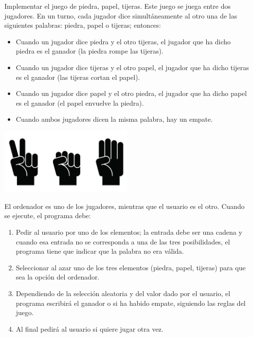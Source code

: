 \begin{ejercicio}
    Implementar el juego de piedra, papel, tijeras. Este juego se juega entre dos jugadores. En un turno, cada
jugador dice simultáneamente al otro una de las siguientes palabras: piedra, papel o tijeras; entonces:

\begin{itemize}
\item Cuando un jugador dice piedra y el otro tijeras, el jugador que ha dicho piedra es el ganador (la piedra rompe las tijeras).
\item Cuando un jugador dice tijeras y el otro papel, el jugador que ha dicho tijeras es el ganador (las tijeras cortan el papel).
\item Cuando un jugador dice papel y el otro piedra, el jugador que ha dicho papel es el ganador (el papel envuelve la piedra).
\item Cuando ambos jugadores dicen la misma palabra, hay un empate.
\end{itemize}

\begin{center}
\includegraphics[width=0.5\textwidth]{book/Spanish/05_Funciones/images/sps.png}
\end{center}

El ordenador es uno de los jugadores, mientras que el usuario es el otro. Cuando se ejecute, el programa debe:

\begin{enumerate}
\item Pedir al usuario por uno de los elementos; la entrada debe ser una cadena y cuando esa entrada no se
corresponda a una de las tres posibilidades, el programa tiene que indicar que la palabra no era válida.
\item Seleccionar al azar uno de los tres elementos (piedra, papel, tijeras) para que sea la opción del ordenador.
\item Dependiendo de la selección aleatoria y del valor dado por el usuario, el programa escribirá
el ganador o si ha habido empate, siguiendo las reglas del juego.
\item Al final pedirá al usuario si quiere jugar otra vez.
\end{enumerate}


\end{ejercicio}
